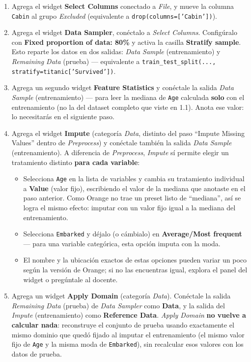 \documentclass[11pt,letterpaper]{article}
\begin{document}
\begin{enumerate}[leftmargin=1.2cm]
  \item Agrega el widget \textbf{Select Columns} conectado a \textit{File}, y mueve la columna \texttt{Cabin} al grupo \textit{Excluded} (equivalente a \texttt{drop(columns=['Cabin'])}).
  \item Agrega el widget \textbf{Data Sampler}, conéctalo a \textit{Select Columns}. Configúralo con \textbf{Fixed proportion of data: 80\%} y activa la casilla \textbf{Stratify sample}. Esto reparte los datos en dos salidas: \textit{Data Sample} (entrenamiento) y \textit{Remaining Data} (prueba) --- equivalente a \texttt{train\_test\_split(..., stratify=titanic['Survived'])}.
  \item Agrega un segundo widget \textbf{Feature Statistics} y conéctale la salida \textit{Data Sample} (entrenamiento) --- para leer la mediana de \texttt{Age} calculada \textbf{solo} con el entrenamiento (no la del dataset completo que viste en 1.1). Anota ese valor: lo necesitarás en el siguiente paso.
  \item Agrega el widget \textbf{Impute} (categoría \textit{Data}, distinto del paso ``Impute Missing Values'' dentro de \textit{Preprocess}) y conéctale también la salida \textit{Data Sample} (entrenamiento). A diferencia de \textit{Preprocess}, \textit{Impute} sí permite elegir un tratamiento distinto \textbf{para cada variable}:
  \begin{itemize}
    \item Selecciona \texttt{Age} en la lista de variables y cambia su tratamiento individual a \textbf{Value} (valor fijo), escribiendo el valor de la mediana que anotaste en el paso anterior. Como Orange no trae un preset listo de ``mediana'', así se logra el mismo efecto: imputar con un valor fijo igual a la mediana del entrenamiento.
    \item Selecciona \texttt{Embarked} y déjalo (o cámbialo) en \textbf{Average/Most frequent} --- para una variable categórica, esta opción imputa con la moda.
    \item El nombre y la ubicación exactos de estas opciones pueden variar un poco según la versión de Orange; si no las encuentras igual, explora el panel del widget o pregúntale al docente.
  \end{itemize}
  \item Agrega un widget \textbf{Apply Domain} (categoría \textit{Data}). Conéctale la salida \textit{Remaining Data} (prueba) de \textit{Data Sampler} como \textbf{Data}, y la salida del \textit{Impute} (entrenamiento) como \textbf{Reference Data}. \textit{Apply Domain} \textbf{no vuelve a calcular nada}: reconstruye el conjunto de prueba usando exactamente el mismo dominio que quedó fijado al imputar el entrenamiento (el mismo valor fijo de \texttt{Age} y la misma moda de \texttt{Embarked}), sin recalcular esos valores con los datos de prueba.
\end{enumerate}
\end{document}
